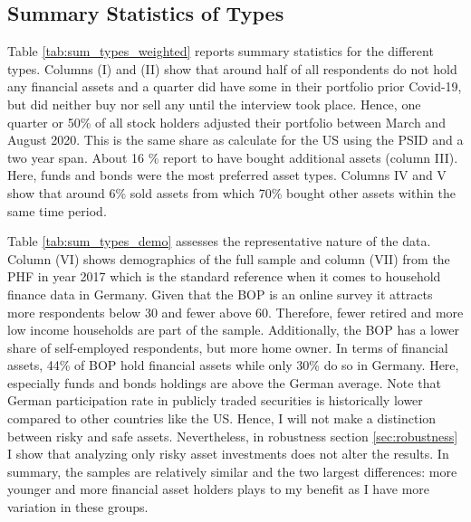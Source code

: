 \documentclass[ProjectABM]{subfiles}
\begin{document}
\subsection{Summary Statistics of Types}\label{sec:des_types}

Table \ref{tab:sum_types_weighted} reports summary statistics for the different types. Columns (I) and (II) show that around half of all respondents do not hold any financial assets and a quarter did have some in their portfolio prior Covid-19, but did neither buy nor sell any until the interview took place. Hence, one quarter or 50\% of all stock holders adjusted their portfolio between March and August 2020. This is the same share as \cite{bonaparte_et_al_2012adjustment} calculate for the US using the PSID and a two year span. %
About 16 \% report to have bought additional assets (column III). Here, funds and bonds were the most preferred asset types. Columns IV and V show that around 6\% sold assets from which 70\% bought other assets within the same time period. 



%



Table \ref{tab:sum_types_demo} assesses the representative nature of the data. Column (VI) shows demographics of the full sample and column (VII) from the PHF in year 2017 which is the standard reference when it comes to household finance data in Germany. Given that the BOP is an online survey it attracts more respondents below 30 and fewer above 60. Therefore, fewer retired and more low income households are part of the sample. Additionally, the BOP has a lower share of self-employed respondents, but more home owner. In terms of financial assets, 44\% of BOP hold financial assets while only 30\% do so in Germany. Here, especially funds and bonds holdings are above the German average. Note that German participation rate in publicly traded securities is historically lower compared to other countries like the US. Hence, I will not make a distinction between risky and safe assets. Nevertheless, in robustness section \ref{sec:robustness} I show that analyzing only risky asset investments does not alter the results. In summary, the samples are relatively similar and the two largest differences: more younger and more financial asset holders plays to my benefit as I have more variation in these groups.
\end{document}
